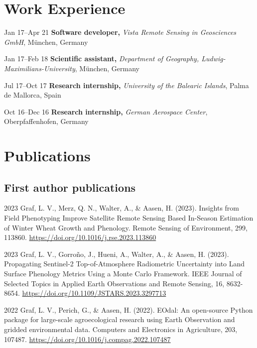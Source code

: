 \begin{cv}{}
\section{Work Experience}
  \begin{cvlist}{}
    \item[Jan 17--Apr 21]
      {\textbf{Software developer, }}{\textit{Vista Remote Sensing in Geosciences GmbH}, München, Germany}
    \item[Jan 17--Feb 18]
      {\textbf{Scientific assistant, }}{\textit{Department of Geography, Ludwig-Maximilians-University}, München, Germany}
    \item[Jul 17--Oct 17]
      {\textbf{Research internship, }}{\textit{University of the Balearic Islands}, Palma de Mallorca, Spain}
    \item[Oct 16--Dec 16]
     {\textbf{Research internship, } }{\textit{German Aerospace Center}, Oberpfaffenhofen, Germany}
  \end{cvlist}


\section{Publications}
\subsection{First author publications}
\begin{cvlist}{}

    \item[2023]
    Graf, L. V., Merz, Q. N., Walter, A., \& Aasen, H. (2023). Insights from Field Phenotyping Improve Satellite Remote Sensing Based In-Season Estimation of Winter Wheat Growth and Phenology. Remote Sensing of Environment, 299, 113860. \url{https://doi.org/10.1016/j.rse.2023.113860}

    \item[2023]
    Graf, L. V., Gorroño, J., Hueni, A., Walter, A., \& Aasen, H. (2023). Propagating Sentinel-2 Top-of-Atmosphere Radiometric Uncertainty into Land Surface Phenology Metrics Using a Monte Carlo Framework. IEEE Journal of Selected Topics in Applied Earth Observations and Remote Sensing, 16, 8632-8654. \url{https://doi.org/10.1109/JSTARS.2023.3297713}

    \item[2022]
    Graf, L. V., Perich, G., \& Aasen, H. (2022). EOdal: An open-source Python package for large-scale agroecological research using Earth Observation and gridded environmental data. Computers and Electronics in Agriculture, 203, 107487. \url{https://doi.org/10.1016/j.compag.2022.107487}


\end{cvlist}
\end{cv}
